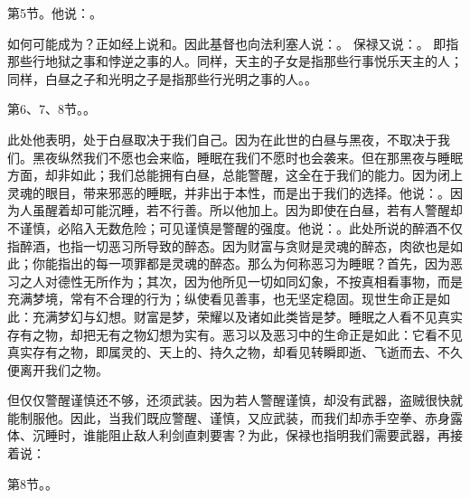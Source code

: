 第5节。他说：。\par

如何可能成为？正如经上说和。因此基督也向法利塞人说：。 保禄又说：。 即指那些行地狱之事和悖逆之事的人。同样，天主的子女是指那些行事悦乐天主的人；同样，白昼之子和光明之子是指那些行光明之事的人。。\par

第6、7、8节。。\par

此处他表明，处于白昼取决于我们自己。因为在此世的白昼与黑夜，不取决于我们。黑夜纵然我们不愿也会来临，睡眠在我们不愿时也会袭来。但在那黑夜与睡眠方面，却非如此；我们总能拥有白昼，总能警醒，这全在于我们的能力。因为闭上灵魂的眼目，带来邪恶的睡眠，并非出于本性，而是出于我们的选择。他说：。因为人虽醒着却可能沉睡，若不行善。所以他加上。因为即使在白昼，若有人警醒却不谨慎，必陷入无数危险；可见谨慎是警醒的强度。他说：。此处所说的醉酒不仅指醉酒，也指一切恶习所导致的醉态。因为财富与贪财是灵魂的醉态，肉欲也是如此；你能指出的每一项罪都是灵魂的醉态。那么为何称恶习为睡眠？首先，因为恶习之人对德性无所作为；其次，因为他所见一切如同幻象，不按真相看事物，而是充满梦境，常有不合理的行为；纵使看见善事，也无坚定稳固。现世生命正是如此：充满梦幻与幻想。财富是梦，荣耀以及诸如此类皆是梦。睡眠之人看不见真实存有之物，却把无有之物幻想为实有。恶习以及恶习中的生命正是如此：它看不见真实存有之物，即属灵的、天上的、持久之物，却看见转瞬即逝、飞逝而去、不久便离开我们之物。\par

但仅仅警醒谨慎还不够，还须武装。因为若人警醒谨慎，却没有武器，盗贼很快就能制服他。因此，当我们既应警醒、谨慎，又应武装，而我们却赤手空拳、赤身露体、沉睡时，谁能阻止敌人利剑直刺要害？为此，保禄也指明我们需要武器，再接着说：\par

第8节。。\par

